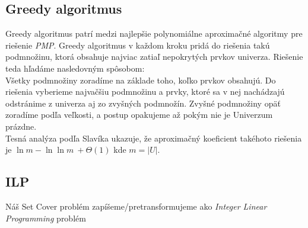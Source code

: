 \subsection{Greedy algoritmus}
Greedy algoritmus patrí medzi najlepšie polynomiálne aproximačné algoritmy pre riešenie \emph{PMP}.\cite{Slavik}
Greedy algoritmus v každom kroku pridá do riešenia takú podmnožinu,
ktorá obsahuje najviac zatiaľ nepokrytých prvkov univerza. Riešenie teda hľadáme nasledovným spôsobom:\\
Všetky podmnožiny zoradíme na základe toho, koľko prvkov obsahujú.
Do riešenia vyberieme najvačšiu podmnožinu a prvky, ktoré sa v nej nachádzajú odstránime z
univerza aj zo zvyšných podmnožín. Zvyšné podmnožiny opäť zoradíme podľa veľkosti,
a postup opakujeme až pokým nie je Univerzum prázdne.\\
Tesná analýza podľa Slavíka ukazuje, že aproximačný koeficient takéhoto riešenia je \(\ln m - \ln \ln m\ +\Theta(1) \) \cite{Slavik} 
kde \(m = |U|\).
\subsection{ILP}
Náš Set Cover problém zapíšeme/pretransformujeme ako \emph{Integer Linear Programming} problém
